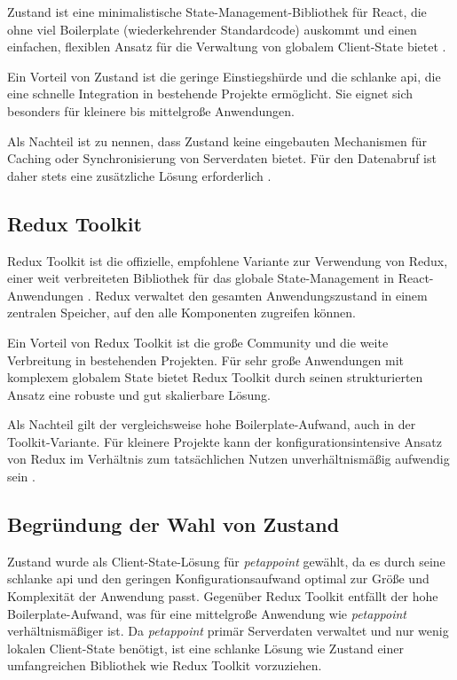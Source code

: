 Zustand ist eine minimalistische State-Management-Bibliothek für React, die ohne viel Boilerplate (wiederkehrender Standardcode) auskommt und einen einfachen, flexiblen Ansatz für die Verwaltung von globalem Client-State bietet \cite{zustand-docs}.

Ein Vorteil von Zustand ist die geringe Einstiegshürde und die schlanke \gls{api}, die eine schnelle Integration in bestehende Projekte ermöglicht. Sie eignet sich besonders für kleinere bis mittelgroße Anwendungen.

Als Nachteil ist zu nennen, dass Zustand keine eingebauten Mechanismen für Caching oder Synchronisierung von Serverdaten bietet. Für den Datenabruf ist daher stets eine zusätzliche Lösung erforderlich 
\cite{zustand-docs}.

\subsection{Redux Toolkit}

Redux Toolkit ist die offizielle, empfohlene Variante zur Verwendung von Redux, einer weit verbreiteten Bibliothek für das globale State-Management in React-Anwendungen \cite{redux-toolkit-docs}. Redux verwaltet den gesamten Anwendungszustand in einem zentralen Speicher, auf den alle Komponenten zugreifen können.

Ein Vorteil von Redux Toolkit ist die große Community und die weite Verbreitung in bestehenden Projekten. Für sehr große Anwendungen mit komplexem globalem State bietet Redux Toolkit durch seinen strukturierten Ansatz eine robuste und gut skalierbare Lösung.

Als Nachteil gilt der vergleichsweise hohe Boilerplate-Aufwand, auch in der Toolkit-Variante. Für kleinere Projekte kann der konfigurationsintensive Ansatz von Redux im Verhältnis zum tatsächlichen Nutzen unverhältnismäßig aufwendig sein \cite{redux-toolkit-docs}.

\subsection{Begründung der Wahl von Zustand}

Zustand wurde als Client-State-Lösung für \textit{petappoint} gewählt, da es durch seine schlanke \gls{api} und den geringen Konfigurationsaufwand optimal zur Größe und Komplexität der Anwendung passt. Gegenüber Redux Toolkit entfällt der hohe Boilerplate-Aufwand, was für eine mittelgroße Anwendung wie \textit{petappoint} verhältnismäßiger ist. Da \textit{petappoint} primär Serverdaten verwaltet und nur wenig lokalen Client-State benötigt, ist eine schlanke Lösung wie Zustand einer umfangreichen Bibliothek 
wie Redux Toolkit vorzuziehen.

